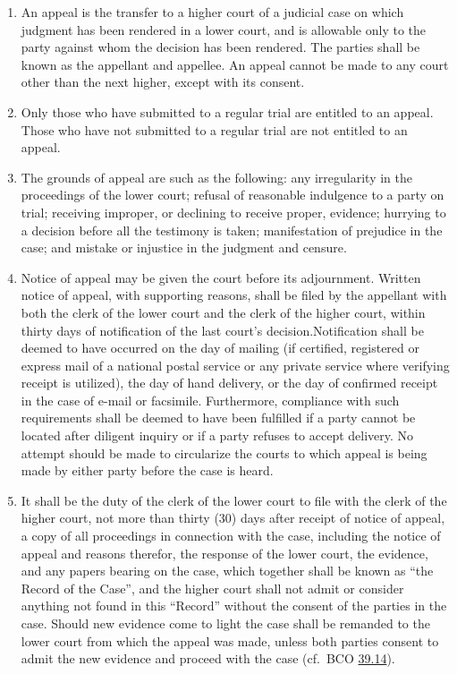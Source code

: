 \documentclass[
]{book}
\providecommand{\tightlist}{%
  \setlength{\itemsep}{0pt}\setlength{\parskip}{0pt}}
\begin{document}
\begin{enumerate}
\def\labelenumi{\arabic{enumi}.}
\tightlist
\item
  \protect\hypertarget{46}{\href{}{}}An appeal is the transfer to a higher court of a judicial case on which judgment has been rendered in a lower court, and is allowable only to the party against whom the decision has been rendered. The parties shall be known as the appellant and appellee. An appeal cannot be made to any court other than the next higher, except with its consent.
\item
  Only those who have submitted to a regular trial are entitled to an appeal. Those who have not submitted to a regular trial are not entitled to an appeal.
\item
  The grounds of appeal are such as the following: any irregularity in the proceedings of the lower court; refusal of reasonable indulgence to a party on trial; receiving improper, or declining to receive proper, evidence; hurrying to a decision before all the testimony is taken; manifestation of prejudice in the case; and mistake or injustice in the judgment and censure.
\item
  Notice of appeal may be given the court before its adjournment. Written notice of appeal, with supporting reasons, shall be filed by the appellant with both the clerk of the lower court and the clerk of the higher court, within thirty days of notification of the last court's decision.Notification shall be deemed to have occurred on the day of mailing (if certified, registered or express mail of a national postal service or any private service where verifying receipt is utilized), the day of hand delivery, or the day of confirmed receipt in the case of e-mail or facsimile. Furthermore, compliance with such requirements shall be deemed to have been fulfilled if a party cannot be located after diligent inquiry or if a party refuses to accept delivery. No attempt should be made to circularize the courts to which appeal is being made by either party before the case is heard.
\item
  It shall be the duty of the clerk of the lower court to file with the clerk of the higher court, not more than thirty (30) days after receipt of notice of appeal, a copy of all proceedings in connection with the case, including the notice of appeal and reasons therefor, the response of the lower court, the evidence, and any papers bearing on the case, which together shall be known as ``the Record of the Case'', and the higher court shall not admit or consider anything not found in this ``Record'' without the consent of the parties in the case. Should new evidence come to light the case shall be remanded to the lower court from which the appeal was made, unless both parties consent to admit the new evidence and proceed with the case (cf.~BCO \protect\hyperlink{39.14}{39.14}).

\end{enumerate}
\end{document}
